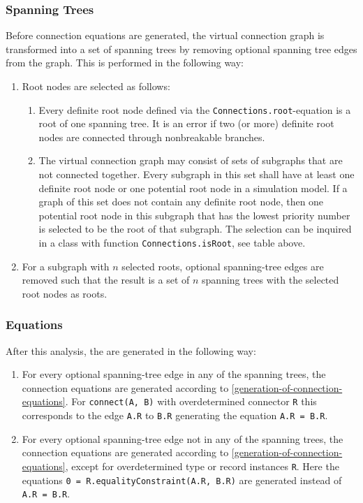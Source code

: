 \subsubsection{Spanning Trees}
Before connection equations are generated, the virtual connection graph is transformed into a set of spanning trees by removing optional spanning tree edges from the graph.
This is performed in the following way:
\begin{enumerate}
\item
  Root nodes are selected as follows:
\begin{enumerate}
\item
  Every definite root node defined via the \lstinline!Connections.root!-equation is a root of one spanning tree.
  It is an error if two (or more) definite root nodes are connected through nonbreakable branches.
\item
  The virtual connection graph may consist of sets of subgraphs that are not connected together.
  Every subgraph in this set shall have at least one definite root node or one potential root node in a simulation model.
  If a graph of this set does not contain any definite root node, then one potential root node in this subgraph that has the lowest priority number is selected to be the root of that subgraph.
  The selection can be inquired in a class with function \lstinline!Connections.isRoot!, see table above.
\end{enumerate}
\item
  For a subgraph with $n$ selected roots, optional spanning-tree edges are removed such that the result is a set of $n$ spanning trees with the selected root nodes as roots.
\end{enumerate}

\subsubsection{Equations}
After this analysis, the  are generated in the following way:
\begin{enumerate}
\item
  For every optional spanning-tree edge in any of the spanning trees, the connection equations are generated according to \cref{generation-of-connection-equations}.
  For \lstinline!connect(A, B)! with overdetermined connector \lstinline!R! this corresponds to the edge \lstinline!A.R! to \lstinline!B.R! generating the equation \lstinline!A.R = B.R!.
\item
  For every optional spanning-tree edge not in any of the spanning trees, the connection equations are generated according to \cref{generation-of-connection-equations}, except for overdetermined type or record instances \lstinline!R!.
  Here the equations \lstinline!0 = R.equalityConstraint(A.R, B.R)! are generated instead of \lstinline!A.R = B.R!.
\end{enumerate}

